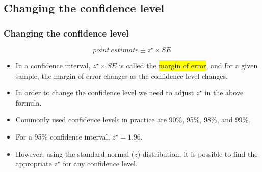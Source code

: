 \documentclass[notes,11pt, aspectratio=169]{beamer}
\begin{document}

\subsection{Changing the confidence level}


\begin{frame}
\frametitle{Changing the confidence level}

\[ point~estimate\pm z^\star \times SE \] 

\begin{itemize}

\item In a confidence interval, $z^\star \times SE$ is called the \hl{margin of error}, and for a given sample, the margin of error changes as the confidence level changes.

\item In order to change the confidence level we need to adjust $z^\star$ in the above formula.

\item Commonly used confidence levels in practice are 90\%, 95\%, 98\%, and 99\%.

\item For a 95\% confidence interval, $z^\star = 1.96$.

\item However, using the standard normal ($z$) distribution, it is possible to find the appropriate $z^\star$ for any confidence level.

\end{itemize}

\end{frame}

\end{document}

